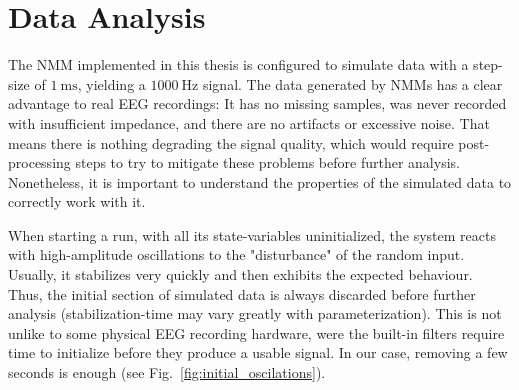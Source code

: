 
\section{Data Analysis}\label{sec:data-analysis}
The NMM implemented in this thesis is configured to simulate data with a step-size of $\SI{1}{\milli\second}$,
yielding a $\SI{1000}{\hertz}$ signal.
The data generated by NMMs has a clear advantage to real EEG recordings:
It has no missing samples,
was never recorded with insufficient impedance,
and there are no artifacts or excessive noise.
That means there is nothing degrading the signal quality,
which would require post-processing steps to try to mitigate these problems
before further analysis.
Nonetheless, it is important to understand the properties of the simulated data to correctly work with it.

When starting a run, with all its state-variables uninitialized,
the system reacts with high-amplitude oscillations to the "disturbance" of the random input.
Usually, it stabilizes very quickly and then exhibits the expected behaviour.
Thus, the initial section of simulated data
is always discarded before further analysis (stabilization-time may vary greatly with parameterization).
This is not unlike to some physical EEG recording hardware,
were the built-in filters require time to initialize before they produce a usable signal.
In our case, removing a few seconds is enough (see Fig.~\ref{fig:initial_oscilations}).

